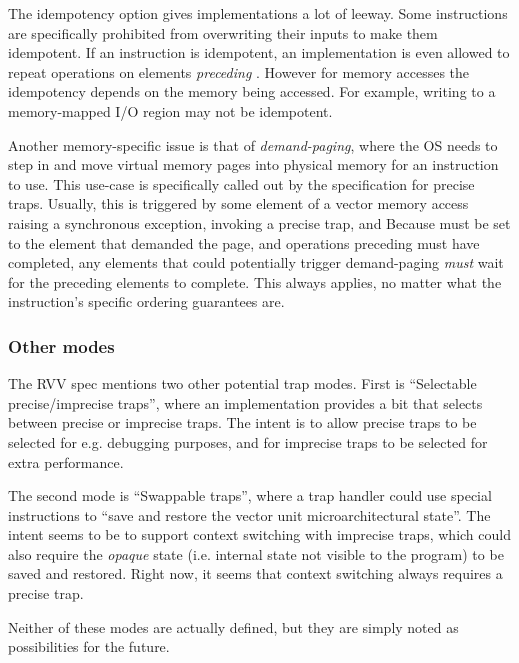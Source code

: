 The idempotency option gives implementations a lot of leeway.
Some instructions  are specifically prohibited from overwriting their inputs to make them idempotent.
If an instruction is idempotent, an implementation is even allowed to repeat operations on elements \emph{preceding} .
However for memory accesses the idempotency depends on the memory being accessed.
For example, writing to a memory-mapped I/O region may not be idempotent.

Another memory-specific issue is that of \emph{demand-paging}, where the OS needs to step in and move virtual memory pages into physical memory for an instruction to use.
This use-case is specifically called out by the specification for precise traps.
Usually, this is triggered by some element of a vector memory access raising a synchronous exception, invoking a precise trap, and 
Because  must be set to the element that demanded the page, and operations preceding  must have completed, any elements that could potentially trigger demand-paging \emph{must} wait for the preceding elements to complete.
This always applies, no matter what the instruction's specific ordering guarantees are.

\subsubsection{Other modes}
The RVV spec mentions two other potential trap modes.
First is \enquote{Selectable precise/imprecise traps}, where an implementation provides a bit that selects between precise or imprecise traps.
The intent is to allow precise traps to be selected for e.g. debugging purposes, and for imprecise traps to be selected for extra performance.

The second mode is \enquote{Swappable traps}, where a trap handler could use special instructions to \enquote{save and restore the vector unit microarchitectural state}.
The intent seems to be to support context switching with imprecise traps, which could also require the \emph{opaque} state (i.e. internal state not visible to the program) to be saved and restored.
Right now, it seems that context switching always requires a precise trap.

Neither of these modes are actually defined, but they are simply noted as possibilities for the future.

\pagebreak
